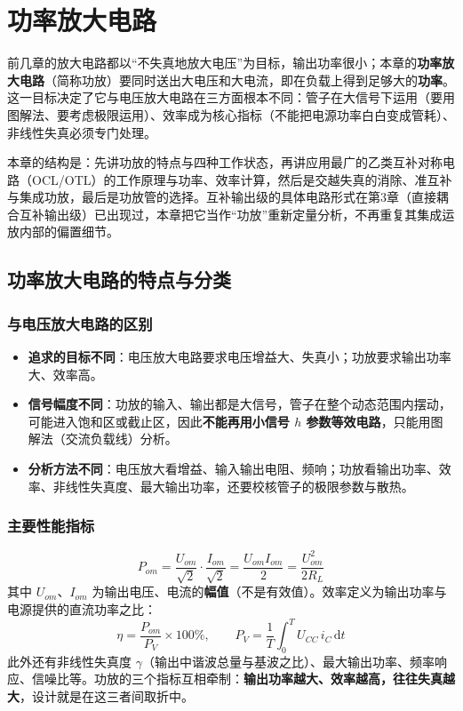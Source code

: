 \chapter{功率放大电路}

前几章的放大电路都以“不失真地放大电压”为目标，输出功率很小；本章的\textbf{功率放大电路}（简称功放）要同时送出大电压和大电流，即在负载上得到足够大的\textbf{功率}。这一目标决定了它与电压放大电路在三方面根本不同：管子在大信号下运用（要用图解法、要考虑极限运用）、效率成为核心指标（不能把电源功率白白变成管耗）、非线性失真必须专门处理。

本章的结构是：先讲功放的特点与四种工作状态，再讲应用最广的乙类互补对称电路（OCL/OTL）的工作原理与功率、效率计算，然后是交越失真的消除、准互补与集成功放，最后是功放管的选择。互补输出级的具体电路形式在第3章（直接耦合互补输出级）已出现过，本章把它当作“功放”重新定量分析，不再重复其集成运放内部的偏置细节。

\section{功率放大电路的特点与分类}
\subsection{与电压放大电路的区别}
\begin{itemize}
    \item \textbf{追求的目标不同}：电压放大电路要求电压增益大、失真小；功放要求输出功率大、效率高。
    \item \textbf{信号幅度不同}：功放的输入、输出都是大信号，管子在整个动态范围内摆动，可能进入饱和区或截止区，因此\textbf{不能再用小信号 $h$ 参数等效电路}，只能用图解法（交流负载线）分析。
    \item \textbf{分析方法不同}：电压放大看增益、输入输出电阻、频响；功放看输出功率、效率、非线性失真度、最大输出功率，还要校核管子的极限参数与散热。
\end{itemize}

\subsection{主要性能指标}
\begin{equation}
P_{om}=\frac{U_{om}}{\sqrt2}\cdot\frac{I_{om}}{\sqrt2}=\frac{U_{om}I_{om}}{2}
=\frac{U_{om}^2}{2R_L}
\end{equation}
其中 $U_{om}$、$I_{om}$ 为输出电压、电流的\textbf{幅值}（不是有效值）。效率定义为输出功率与电源提供的直流功率之比：
\begin{equation}
\eta=\frac{P_{om}}{P_V}\times100\%,\qquad P_V=\frac{1}{T}\int_0^{T}U_{CC}\,i_C\,\mathrm{d}t
\end{equation}
此外还有非线性失真度 $\gamma$（输出中谐波总量与基波之比）、最大输出功率、频率响应、信噪比等。功放的三个指标互相牵制：\textbf{输出功率越大、效率越高，往往失真越大}，设计就是在这三者间取折中。

